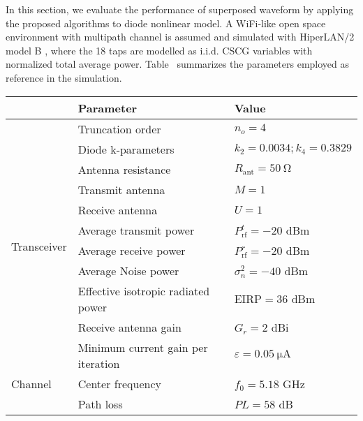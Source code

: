 In this section, we evaluate the performance of superposed waveform by applying the proposed algorithms to diode nonlinear model. A WiFi-like open space environment with multipath channel is assumed and simulated with HiperLAN/2 model B \cite{Medbo1998}, where the 18 taps are modelled as i.i.d. CSCG variables with normalized total average power. Table \ summarizes the parameters employed as reference in the simulation.

\begin{table}[h!]\label{tab:reference_parameters}
\begin{tabular}{lll}
                              & Parameter                          & Value                                \\ \hline
\multirow{11}{*}{Transceiver} & Truncation order                   & ${n_o} = 4$                          \\
                              & Diode k-parameters                 & ${k_2} = 0.0034;{k_4} = 0.3829$      \\
                              & Antenna resistance                 & ${R_{{\text{ant}}}} = \SI{50}{\ohm}$ \\
                              & Transmit antenna                   & $M = 1$                              \\
                              & Receive antenna                    & $U = 1$                              \\
                              & Average transmit power             & $P_{{\text{rf}}}^t =  - 20$ dBm      \\
                              & Average receive power              & $P_{{\text{rf}}}^r =  - 20$ dBm      \\
                              & Average Noise power                & $\sigma _n^2 =  - 40$ dBm            \\
                              & Effective isotropic radiated power & $\text{EIRP} = 36$ dBm               \\
                              & Receive antenna gain               & ${G_r} = 2$ dBi                      \\
                              & Minimum current gain per iteration & $\varepsilon  = \SI{0.05}{\uA}$      \\ \hline
Channel                       & Center frequency                   & ${f_0} = 5.18$ GHz                   \\
                              & Path loss                          & $PL = 58$ dB                         \\

\end{tabular}
\end{table}
